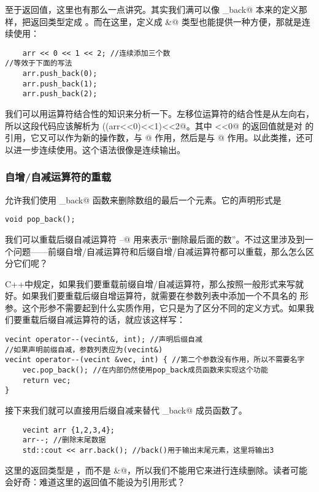 至于返回值，这里也有那么一点讲究。其实我们满可以像 \lstinline@push_back@ 本来的定义那样，把返回类型定成 \lstinline@void@。而在这里，定义成 \lstinline@vecint&@ 类型也能提供一种方便，那就是连续使用：
\begin{lstlisting}
    arr << 0 << 1 << 2; //连续添加三个数
//等效于下面的写法
    arr.push_back(0);
    arr.push_back(1);
    arr.push_back(2);
\end{lstlisting}
我们可以用运算符结合性的知识来分析一下。左移位运算符的结合性是从左向右，所以这段代码应该解析为 \lstinline@((arr<<0)<<1)<<2@。其中 \lstinline@arr<<0@ 的返回值就是对 \lstinline@arr@ 的引用，它又可以作为新的操作数，与 @ 作用，然后是与 @ 作用。以此类推，还可以进一步连续使用。这个语法很像是连续输出。\par
\subsubsection*{自增/自减运算符的重载}
\lstinline@vecint@ 允许我们使用 \lstinline@pop_back@ 函数来删除数组的最后一个元素。它的声明形式是
\begin{lstlisting}
void pop_back();
\end{lstlisting}\par
我们可以重载后缀自减运算符 \lstinline@--@ 用来表示``删除最后面的数''。不过这里涉及到一个问题——前缀自增/自减运算符和后缀自增/自减运算符都可以重载，那么怎么区分它们呢？\par
C++中规定，如果我们要重载前缀自增/自减运算符，那么按照一般形式来写就好。如果我们要重载后缀自增运算符，就需要在参数列表中添加一个不具名的 \lstinline@int@ 形参。这个形参不需要起到什么实质作用，它只是为了区分不同的定义方式。如果我们要重载后缀自减运算符的话，就应该这样写：
\begin{lstlisting}
vecint operator--(vecint&, int); //声明后缀自减
//如果声明前缀自减，参数列表应为(vecint&)
vecint operator--(vecint &vec, int) { //第二个参数没有作用，所以不需要名字
    vec.pop_back(); //在内部仍然使用pop_back成员函数来实现这个功能
    return vec;
}
\end{lstlisting}
接下来我们就可以直接用后缀自减来替代 \lstinline@pop_back@ 成员函数了。
\begin{lstlisting}
    vecint arr {1,2,3,4};
    arr--; //删除末尾数据
    std::cout << arr.back(); //back()用于输出末尾元素，这里将输出3
\end{lstlisting}\par
这里的返回类型是 \lstinline@vecint@，而不是 \lstinline@vecint&@，所以我们不能用它来进行连续删除。读者可能会好奇：难道这里的返回值不能设为引用形式？\par
